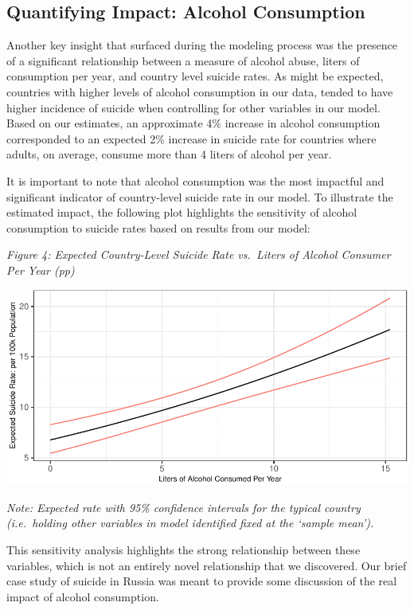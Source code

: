 \documentclass[]{article}
\begin{document}
\subsection{Quantifying Impact: Alcohol
Consumption}\label{quantifying-impact-alcohol-consumption}

Another key insight that surfaced during the modeling process was the
presence of a significant relationship between a measure of alcohol
abuse, liters of consumption per year, and country level suicide rates.
As might be expected, countries with higher levels of alcohol
consumption in our data, tended to have higher incidence of suicide when
controlling for other variables in our model. Based on our estimates, an
approximate 4\% increase in alcohol consumption corresponded to an
expected 2\% increase in suicide rate for countries where adults, on
average, consume more than 4 liters of alcohol per year.

It is important to note that alcohol consumption was the most impactful
and significant indicator of country-level suicide rate in our model. To
illustrate the estimated impact, the following plot highlights the
sensitivity of alcohol consumption to suicide rates based on results
from our model:

\emph{Figure 4: Expected Country-Level Suicide Rate vs.~Liters of
Alcohol Consumer Per Year (pp)}

\begin{center}\includegraphics{Project_Report_files/figure-latex/a_alc_plot-1} \end{center}

\emph{Note: Expected rate with 95\% confidence intervals for the typical
country (i.e.~holding other variables in model identified fixed at the
`sample mean').}

This sensitivity analysis highlights the strong relationship between
these variables, which is not an entirely novel relationship that we
discovered. Our brief case study of suicide in Russia was meant to
provide some discussion of the real impact of alcohol consumption.
\end{document}
